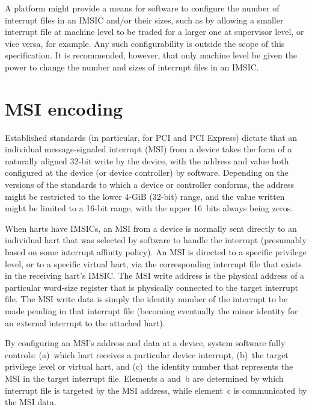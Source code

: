 A platform might provide a means for software to configure the
number of interrupt files in an IMSIC and/or their sizes, such as
by allowing a smaller interrupt file at machine level to be traded
for a larger one at supervisor level, or vice versa, for example.
Any such configurability is outside the scope of this specification.
It is recommended, however, that only machine level be given the power
to change the number and sizes of interrupt files in an IMSIC.

\section{MSI encoding}
\label{sec:MSIEncoding}

Established standards (in particular, for PCI and PCI Express) dictate
that an individual message-signaled interrupt (MSI) from a device takes
the form of a naturally aligned \mbox{32-bit} write by the device,
with the address and value both configured at the device (or device
controller) by software.
Depending on the versions of the standards to which a device or
controller conforms, the address might be restricted to the lower
\mbox{4-GiB} (\mbox{32-bit}) range, and the value written might be
limited to a \mbox{16-bit} range, with the upper 16~bits always being
zeros.

When {\RISCV} harts have IMSICs, an MSI from a device is normally sent
directly to an individual hart that was selected by software to handle
the interrupt (presumably based on some interrupt affinity policy).
An MSI is directed to a specific privilege level, or to a specific
virtual hart, via the corresponding interrupt file that exists in the
receiving hart's IMSIC.
The MSI write address is the physical address of a particular word-size
register that is physically connected to the target interrupt file.
The MSI write data is simply the identity number of the interrupt to
be made pending in that interrupt file (becoming eventually the minor
identity for an external interrupt to the attached hart).

By configuring an MSI's address and data at a device, system software
fully controls:
(a)~which hart receives a particular device interrupt,
(b)~the target privilege level or virtual hart, and
(c)~the identity number that represents the MSI in the target interrupt
file.
Elements a and~b are determined by which interrupt file is targeted by
the MSI address, while element~c is communicated by the MSI data.

